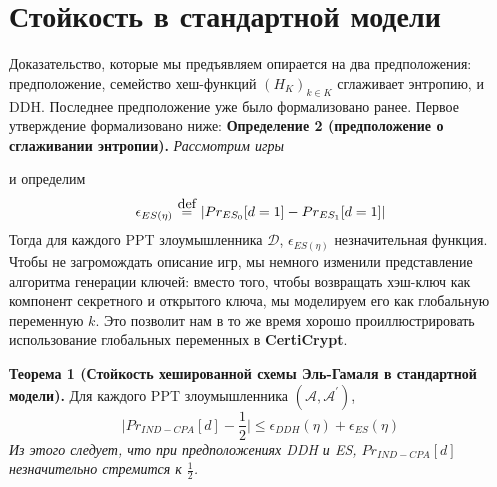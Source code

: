 \documentclass[a4paper,12pt]{report}
\newcommand\myeq{\stackrel{\mathclap{\normalfont\mbox{def}}}{=}}
\begin{document}
\section{Стойкость в стандартной модели}
Доказательство, которые мы предъявляем опирается на два предположения: предположение, семейство хеш-функций $(H_K)_{k \in K}$ сглаживает энтропию, и DDH. Последнее предположение уже было формализовано ранее. Первое утверждение формализовано ниже:
\textbf{Определение 2 (предположение о сглаживании энтропии).} \textit{Рассмотрим игры}
\begin{figure}[h]
  \centering
  \begin{subfigure}[b]{0.3\textwidth}
    \centering
\end{subfigure}
\begin{subfigure}[b]{0.3\textwidth}
  \centering
\end{subfigure}
\end{figure}
и определим
\[ \epsilon_{ES(\eta)} \ \myeq \ \lvert Pr_{ES_0}[d = 1] - Pr_{ES_1}[d = 1] \rvert \]
Тогда для каждого PPT злоумышленника $\mathcal{D}$, $\epsilon_{ES(\eta)}$ незначительная функция.
Чтобы не загромождать описание игр, мы немного изменили представление алгоритма генерации ключей: вместо того, чтобы возвращать хэш-ключ как компонент секретного и открытого ключа, мы моделируем его как глобальную переменную $k$. Это позволит нам в то же время хорошо проиллюстрировать использование глобальных переменных в \textbf{CertiCrypt}.

\textbf{Теорема 1 (Стойкость хешированной схемы Эль-Гамаля в стандартной модели).} Для каждого PPT злоумышленника $( \mathcal{A}, \mathcal{A^\prime})$,
\[ \lvert Pr_{IND-CPA}[d] - \frac{1}{2} \rvert \leq \epsilon_{DDH}(\eta) + \epsilon_{ES}(\eta)\]
\textit{Из этого следует, что при предположениях DDH и ES, $Pr_{IND-CPA}[d] $ незначительно стремится к $ \frac{1}{2}$.}
\end{document}
